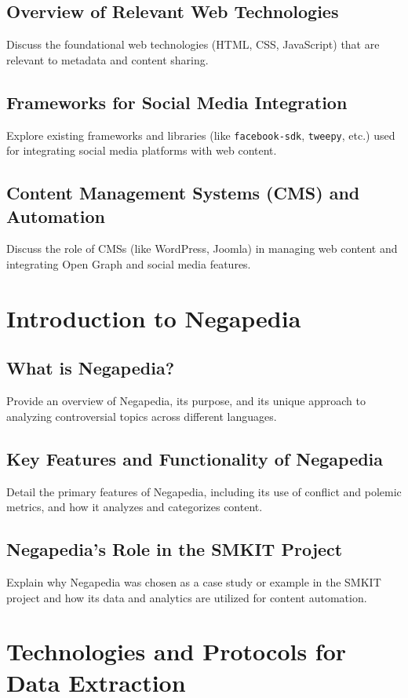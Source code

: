\subsection{Overview of Relevant Web Technologies}
Discuss the foundational web technologies (HTML, CSS, JavaScript) that are relevant to metadata and content sharing.

\subsection{Frameworks for Social Media Integration}
Explore existing frameworks and libraries (like \texttt{facebook-sdk}, \texttt{tweepy}, etc.) used for integrating social media platforms with web content.

\subsection{Content Management Systems (CMS) and Automation}
Discuss the role of CMSs (like WordPress, Joomla) in managing web content and integrating Open Graph and social media features.

\section{Introduction to Negapedia}
\label{sec:introduction-negapedia}
\subsection{What is Negapedia?}
Provide an overview of Negapedia, its purpose, and its unique approach to analyzing controversial topics across different languages.

\subsection{Key Features and Functionality of Negapedia}
Detail the primary features of Negapedia, including its use of conflict and polemic metrics, and how it analyzes and categorizes content.

\subsection{Negapedia's Role in the SMKIT Project}
Explain why Negapedia was chosen as a case study or example in the SMKIT project and how its data and analytics are utilized for content automation.

\section{Technologies and Protocols for Data Extraction}
\label{sec:data-extraction}
